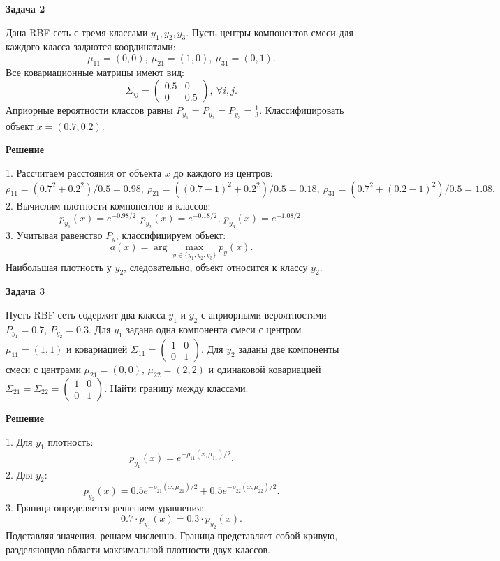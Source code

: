 \textbf{Задача 2}

Дана RBF-сеть с тремя классами $ y_1, y_2, y_3 $. Пусть центры компонентов смеси для каждого класса задаются координатами:
\[
    \mu_{11} = (0, 0), \ \mu_{21} = (1, 0), \ \mu_{31} = (0, 1).
\]
Все ковариационные матрицы имеют вид:
\[
    \Sigma_{ij} = \begin{pmatrix} 0.5 & 0   \\
                0   & 0.5\end{pmatrix}, \ \forall i, j.
\]
Априорные вероятности классов равны $ P_{y_1} = P_{y_2} = P_{y_3} = \frac{1}{3} $. Классифицировать объект $ x = (0.7, 0.2) $.

\textbf{Решение}

1. Рассчитаем расстояния от объекта $ x $ до каждого из центров:
\[
    \rho_{11} = (0.7^2 + 0.2^2)/0.5 = 0.98, \ \rho_{21} = ((0.7 - 1)^2 + 0.2^2)/0.5 = 0.18, \ \rho_{31} = (0.7^2 + (0.2 - 1)^2)/0.5 = 1.08.
\]
2. Вычислим плотности компонентов и классов:
\[
    p_{y_1}(x) = e^{-0.98/2}, p_{y_2}(x) = e^{-0.18/2}, \ p_{y_3}(x) = e^{-1.08/2}.
\]
3. Учитывая равенство $ P_y $, классифицируем объект:
\[
    a(x) = \arg\max_{y \in \{y_1, y_2, y_3\}} p_y(x).
\]
Наибольшая плотность у $ y_2 $, следовательно, объект относится к классу $ y_2 $.

\textbf{Задача 3}

Пусть RBF-сеть содержит два класса $ y_1 $ и $ y_2 $ с априорными вероятностями $ P_{y_1} = 0.7 $, $ P_{y_2} = 0.3 $. Для $ y_1 $ задана одна компонента смеси с центром $ \mu_{11} = (1, 1) $ и ковариацией $ \Sigma_{11} = \begin{pmatrix} 1 & 0 \\
                0 & 1\end{pmatrix} $. Для $ y_2 $ заданы две компоненты смеси с центрами $ \mu_{21} = (0, 0) $, $ \mu_{22} = (2, 2) $ и одинаковой ковариацией $ \Sigma_{21} = \Sigma_{22} = \begin{pmatrix} 1 & 0 \\
                0 & 1\end{pmatrix} $. Найти границу между классами.

\textbf{Решение}

1. Для $ y_1 $ плотность:
\[
    p_{y_1}(x) = e^{-\rho_{11}(x, \mu_{11})/2}.
\]
2. Для $ y_2 $:
\[
    p_{y_2}(x) = 0.5 e^{-\rho_{21}(x, \mu_{21})/2} + 0.5 e^{-\rho_{22}(x, \mu_{22})/2}.
\]
3. Граница определяется решением уравнения:
\[
    0.7 \cdot p_{y_1}(x) = 0.3 \cdot p_{y_2}(x).
\]
Подставляя значения, решаем численно. Граница представляет собой кривую, разделяющую области максимальной плотности двух классов.


